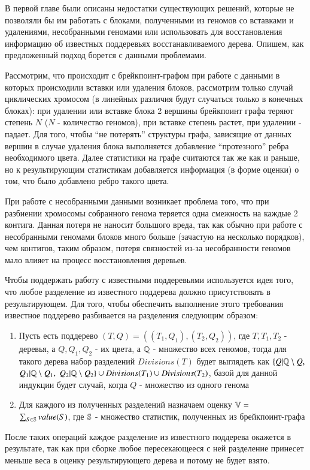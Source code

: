 В первой главе были описаны недостатки существующих решений, которые не позволяли бы им работать с блоками, полученными из геномов со вставками
и удалениями, несобранными геномами или использовать для восстановления информацию об известных поддеревьях восстанавливаемого дерева.
Опишем, как предложенный подход борется с данными проблемами.

Рассмотрим, что происходит с брейкпоинт-графом при работе с данными в которых происходили вставки или удаления блоков,
рассмотрим только случай циклических хромосом (в линейных различия будут случаться только в конечных блоках):
при удалении или вставке блока 2 вершины брейкпоинт графа теряют степень $N$ ($N$ - количество геномов), при вставке степень растет,
при удалении - падает.
Для того, чтобы ``не потерять'' структуры графа, зависящие от данных вершин в случае удаления блока выполняется добавление ``протезного'' ребра
необходимого цвета.
Далее статистики на графе считаются так же как и раньше, но к результирующим статистикам добавляется информация (в форме оценки) о том,
что было добавлено ребро такого цвета.

При работе с несобранными данными возникает проблема того, что при разбиении хромосомы собранного генома теряется одна смежность на каждые
2 контига.
Данная потеря не наносит большого вреда, так как обычно при работе с несобранными геномами блоков много больше (зачастую на несколько порядков),
чем контигов, таким образом, потеря связностей из-за несобранности геномов мало влияет на процесс восстановления деревьев.

Чтобы поддержать работу с известными поддеревьями используется идея того, что любое разделение из известного поддерева должно присутствовать в результирующем.
Для того, чтобы обеспечить выполнение этого требования известное поддерево разбивается на разделения следующим образом:
\begin{enumerate}
  \item Пусть есть поддерево $(T, Q) = ((T_1, Q_1), (T_2, Q_2))$, где $T, T_1, T_2$ - деревья, а $Q, Q_1, Q_2$ - их цвета,
    а $\mathbb{Q}$ - множество всех геномов, тогда для такого дерева набор разделений $Divisions(T)$ будет выглядеть как
    $\{Q|\mathbb{Q} \setminus  Q,$ $Q_1|\mathbb{Q} \setminus Q_1,$ $Q_2|\mathbb{Q} \setminus Q_2\} \cup Divisions(T_1) \cup Divisions(T_2)$,
    базой для данной индукции будет случай, когда $Q$ - множество из одного генома
  \item Для каждого из полученных разделений назначаем оценку $\mathbb{V}=$ \\
    $\sum\nolimits_{S \in \mathbb{S}} value(S)$, где $\mathbb{S}$ - множество статистик, полученных из брейкпоинт-графа
\end{enumerate}
После таких операций каждое разделение из известного поддерева окажется в результате, так как при сборке любое пересекающееся с ней разделение
принесет меньше веса в оценку результирующего дерева и потому не будет взято.
